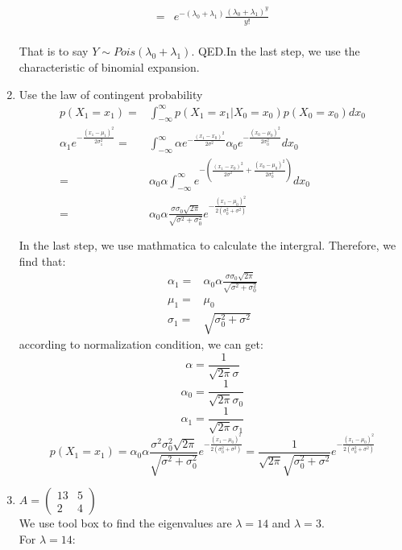 \documentclass[pdftex,11pt]{article}
\begin{document}
\begin{enumerate}
\begin{align*}
= & e^{-(\lambda_{0}+\lambda_{1})}\frac{(\lambda_{0}+\lambda_{1})^{y}}{y!}
\end{align*}
\\
That is to say $Y\sim Pois(\lambda_{0}+\lambda_{1})$. QED.In the
last step, we use the characteristic of binomial expansion. 
\item Use the law of contingent probability
\begin{align*}
p(X_{1}=x_{1})= & \int_{-\infty}^{\infty}p(X_{1}=x_{1}|X_{0}=x_{0})p(X_{0}=x_{0})dx_{0}\\
\alpha_{1}e^{-\frac{(x_{1}-\mu_{1})^{2}}{2\sigma_{1}^{2}}}= & \int_{-\infty}^{\infty}\alpha e^{-\frac{(x_{1}-x_{0})^{2}}{2\sigma^{2}}}\alpha_{0}e^{-\frac{(x_{0}-\mu_{0})^{2}}{2\sigma_{0}^{2}}}dx_{0}\\
= & \alpha_{0}\alpha\int_{-\infty}^{\infty}e^{-(\frac{(x_{1}-x_{0})^{2}}{2\sigma^{2}}+\frac{(x_{0}-\mu_{0})^{2}}{2\sigma_{0}^{2}})}dx_{0}\\
= & \alpha_{0}\alpha\frac{\sigma\sigma_{0}\sqrt{2\pi}}{\sqrt{\sigma^{2}+\sigma_{0}^{2}}}e^{-\frac{(x_{1}-\mu_{0})^{2}}{2(\sigma_{0}^{2}+\sigma^{2})}}\\
\\
\end{align*}
In the last step, we use mathmatica to calculate the intergral. Therefore,
we find that:
\begin{align*}
\alpha_{1}= & \alpha_{0}\alpha\frac{\sigma\sigma_{0}\sqrt{2\pi}}{\sqrt{\sigma^{2}+\sigma_{0}^{2}}}\\
\mu_{1}= & \mu_{0}\\
\sigma_{1}= & \sqrt{\sigma_{0}^{2}+\sigma^{2}}
\end{align*}
according to normalization condition, we can get:
\[
\alpha=\frac{1}{\sqrt{2\pi}\sigma}
\]
\[
\alpha_{0}=\frac{1}{\sqrt{2\pi}\sigma_{0}}
\]
\[
\alpha_{1}=\frac{1}{\sqrt{2\pi}\sigma_{1}}
\]
\[
p(X_{1}=x_{1})=\alpha_{0}\alpha\frac{\sigma^{2}\sigma_{0}^{2}\sqrt{2\pi}}{\sqrt{\sigma^{2}+\sigma_{0}^{2}}}e^{-\frac{(x_{1}-\mu_{0})^{2}}{2(\sigma_{0}^{2}+\sigma^{2})}}=\frac{1}{\sqrt{2\pi}\sqrt{\sigma_{0}^{2}+\sigma^{2}}}e^{-\frac{(x_{1}-\mu_{0})^{2}}{2(\sigma_{0}^{2}+\sigma^{2})}}
\]
\item $A=\left(\begin{array}{cc}
13 & 5\\
2 & 4
\end{array}\right)$\\
We use tool box to find the eigenvalues are $\lambda=14$ and $\lambda=3$.\\
For $\lambda=14$:

\end{enumerate}
\end{document}
